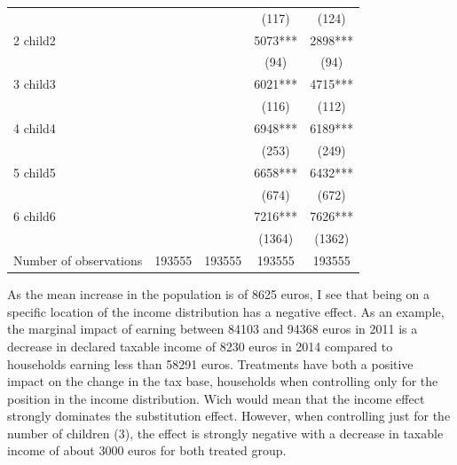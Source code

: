 \begin{subappendices}
\begin{table}[H]
{\begin{tabular}{lcccc}
                                        &               &               & (117)         & (124)                    \\   
2 child2                                &               &               & 5073***       & 2898***               \\     
                                        &               &               & (94)          & (94)                     \\   
3 child3                                &               &               & 6021***       & 4715***               \\     
                                        &               &               & (116)         & (112)                    \\   
4 child4                                &               &               & 6948***       & 6189***               \\     
                                        &               &               & (253)         & (249)                    \\   
5 child5                                &               &               & 6658***       & 6432***               \\     
                                        &               &               & (674)         & (672)                    \\   
6 child6                                &               &               & 7216***       & 7626***               \\   
                                        &               &               & (1364)        & (1362)                 \\   
\bottomrule
Number of observations & 193555 & 193555 & 193555 &  193555 \\
\bottomrule
\end{tabular}
}
\end{table}

As the mean increase in the population is of 8625 euros, I see that being on a specific location of the income distribution has a negative effect. As an example, the marginal impact of earning between 84103 and 94368 euros in 2011 is a decrease in declared taxable income of 8230 euros in 2014 compared to households earning less than 58291 euros. Treatments have both a positive impact on the change in the tax base, households when controlling only for the position in the income distribution. Wich would mean that the income effect strongly dominates the substitution effect. However, when controlling just for the number of children (3), the effect is strongly negative with a decrease in taxable income of about 3000 euros for both treated group. 


\end{subappendices}
